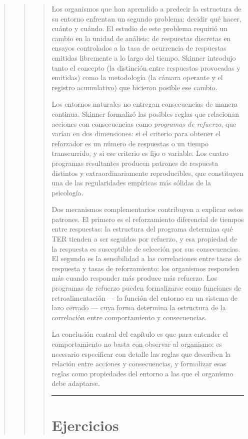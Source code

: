 \documentclass[
  letterpaper,
  DIV=11,
  numbers=noendperiod]{scrreprt}
\begin{document}
\begin{tcolorbox}[enhanced jigsaw, toprule=.15mm, arc=.35mm, colback=white, opacityback=0, colframe=quarto-callout-note-color-frame, breakable, rightrule=.15mm, left=2mm, leftrule=.75mm, bottomrule=.15mm]
\begin{quote}
\begin{quote}
\begin{quote}
Los organismos que han aprendido a predecir la estructura de su entorno
enfrentan un segundo problema: decidir qué hacer, cuánto y cuándo. El
estudio de este problema requirió un cambio en la unidad de análisis: de
respuestas discretas en ensayos controlados a la tasa de ocurrencia de
respuestas emitidas libremente a lo largo del tiempo. Skinner introdujo
tanto el concepto (la distinción entre respuestas provocadas y emitidas)
como la metodología (la cámara operante y el registro acumulativo) que
hicieron posible ese cambio.

Los entornos naturales no entregan consecuencias de manera continua.
Skinner formalizó las posibles reglas que relacionan acciones con
consecuencias como \emph{programas de refuerzo}, que varían en dos
dimensiones: si el criterio para obtener el reforzador es un número de
respuestas o un tiempo transcurrido, y si ese criterio es fijo o
variable. Los cuatro programas resultantes producen patrones de
respuesta distintos y extraordinariamente reproducibles, que constituyen
una de las regularidades empíricas más sólidas de la psicología.

Dos mecanismos complementarios contribuyen a explicar estos patrones. El
primero es el reforzamiento diferencial de tiempos entre respuestas: la
estructura del programa determina qué TER tienden a ser seguidos por
refuerzo, y esa propiedad de la respuesta es susceptible de selección
por sus consecuencias. El segundo es la sensibilidad a las correlaciones
entre tasas de respuesta y tasas de reforzamiento: los organismos
responden más cuando responder más produce más refuerzo. Los programas
de refuerzo pueden formalizarse como funciones de retroalimentación ---
la función del entorno en un sistema de lazo cerrado --- cuya forma
determina la estructura de la correlación entre comportamiento y
consecuencias.

La conclusión central del capítulo es que para entender el
comportamiento no basta con observar al organismo: es necesario
especificar con detalle las reglas que describen la relación entre
acciones y consecuencias, y formalizar esas reglas como propiedades del
entorno a las que el organismo debe adaptarse.

\begin{center}\rule{0.5\linewidth}{0.5pt}\end{center}

\section{Ejercicios}\label{ejercicios-5}


\end{quote}
\end{quote}
\end{quote}
\end{tcolorbox}
\end{document}
